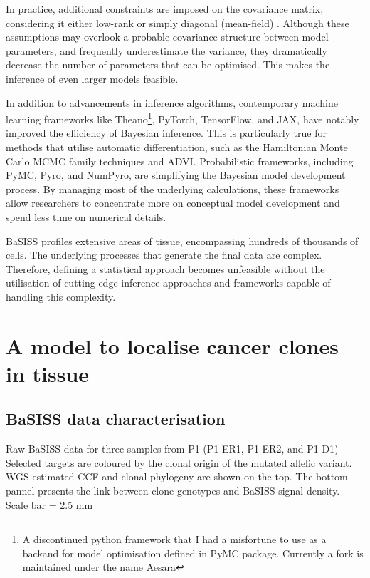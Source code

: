 In practice, additional constraints are imposed on the covariance matrix, considering it either low-rank or simply diagonal (mean-field) \parencite{Blei2017-dm}. Although these assumptions may overlook a probable covariance structure between model parameters, and frequently underestimate the variance, they dramatically decrease the number of parameters that can be optimised. This makes the inference of even larger models feasible.

In addition to advancements in inference algorithms, contemporary machine learning frameworks like \ac{Theano}\footnote{A discontinued python framework that I had a misfortune to use as a backand for model optimisation defined in PyMC package. Currently a fork is maintained under the name Aesara}, \ac{PyTorch}, \ac{TensorFlow}, and \ac{JAX}, have notably improved the efficiency of Bayesian inference. This is particularly true for methods that utilise automatic differentiation, such as the Hamiltonian Monte Carlo \ac{MCMC} family techniques and \ac{ADVI}. Probabilistic frameworks, including \ac{PyMC}, \ac{Pyro}, and \ac{NumPyro}, are simplifying the Bayesian model development process. By managing most of the underlying calculations, these frameworks allow researchers to concentrate more on conceptual model development and spend less time on numerical details.

\ac{BaSISS} profiles extensive areas of tissue, encompassing hundreds of thousands of cells. The underlying processes that generate the final data are complex. Therefore, defining a statistical approach becomes unfeasible without the utilisation of cutting-edge inference approaches and frameworks capable of handling this complexity.

\section{A model to localise cancer clones in tissue}
\subsection{BaSISS data characterisation}
\label{sec:bassis-data-brief}

    {Raw \ac{BaSISS} data for three samples from P1 (P1-ER1, P1-ER2, and P1-D1)}
    {Selected targets are coloured by the clonal origin of the mutated allelic variant. \ac{WGS} estimated \acl{CCF} and clonal phylogeny are shown on the top. The bottom pannel presents the link between clone genotypes and \ac{BaSISS} signal density. Scale bar = 2.5 mm}

